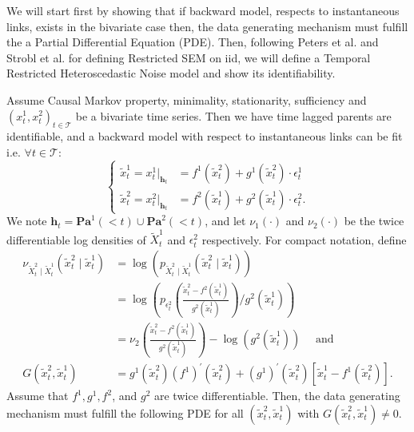 We will start first by showing that if backward model, respects to instantaneous links, exists in the bivariate case then, the data generating mechanism must fulfill the
a Partial Differential Equation (PDE). Then, following Peters et al. \citep{peters2014causal} and Strobl et al. \citep{strobl2023identifying} for defining Restricted SEM on iid, we will define a Temporal Restricted Heteroscedastic Noise model and show its identifiability.
\begin{mybox}
\begin{lemma}
Assume Causal Markov property, minimality, stationarity, sufficiency and $(x^1_t,x^2_t)_{t \in \mathcal{T}}$ be a bivariate time series. Then we have time lagged parents are identifiable, and a backward model with respect to instantaneous links can be fit i.e. $\forall t \in \mathcal{T}$:
\begin{equation}
\left \{
\begin{aligned}
    \tilde{x}_t^1 = x_t^1|_{\boldsymbol{h}_t}&= f^1\left(\tilde{x}_t^2\right)+g^1\left(\tilde{x}_t^2\right)\cdot\epsilon_t^{1}\\
     \tilde{x}_t^2 = x_t^2|_{\boldsymbol{h}_t}&= f^2\left(\tilde{x}_t^1\right)+g^2\left( \tilde{x}_t^1\right)\cdot\epsilon_t^{2}.
\end{aligned}
    \right.
    \label{eq_restricted_bivariate}
\end{equation} 
We note $\boldsymbol{h}_t = \mathbf{P a}^1(<t) \cup \mathbf{P a}^2(<t)$, and let $\nu_1(\cdot)$ and $\nu_2(\cdot)$ be the twice differentiable log densities of $\tilde{X}_t^1$ and $\epsilon_t^{2}$ respectively. For compact notation, define
$$
\begin{aligned}
\nu_{\tilde{X}_t^2 \mid \tilde{X}_t^1}(\tilde{x}_t^2 \mid \tilde{x}_t^1) & =\log \left(p_{\tilde{X}_t^2 \mid \tilde{X}_t^1}(\tilde{x}_t^2 \mid \tilde{x}_t^1)\right) \\
& =\log \left(p_{\epsilon_t^{2}}\left(\frac{\tilde{x}_t^2-f^2(\tilde{x}_t^1)}{g^2(\tilde{x}_t^1)}\right) / g^2(\tilde{x}_t^1)\right) \\
& =\nu_2\left(\frac{\tilde{x}_t^2-f^2(\tilde{x}_t^1)}{g^2(\tilde{x}_t^1)}\right)-\log (g^2(\tilde{x}_t^1)) \quad \text { and } \\
G(\tilde{x}_t^2, \tilde{x}_t^1) & =g^1(\tilde{x}_t^2) (f^1)^{\prime}(\tilde{x}_t^2)+(g^1)^{\prime}(\tilde{x}_t^2)[\tilde{x}_t^1-f^1(\tilde{x}_t^2)] .
\end{aligned}
$$
Assume that $f^1, g^1, f^2$, and $g^2$ are twice differentiable. Then, the data generating mechanism must fulfill the following PDE for all $(\tilde{x}_t^2, \tilde{x}_t^1) $ with $G(\tilde{x}_t^2, \tilde{x}_t^1) \neq 0$.

\end{lemma}
\end{mybox}
